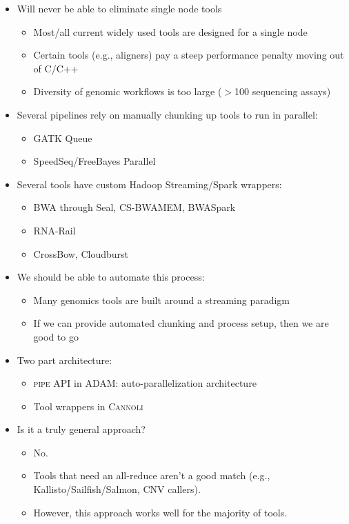 \documentclass[phd]{ucbthesis}
\begin{document}
\begin{itemize}
\item Will never be able to eliminate single node tools
  \begin{itemize}
  \item Most/all current widely used tools are designed for a single node
  \item Certain tools (e.g., aligners) pay a steep performance penalty moving out of C/C++
  \item Diversity of genomic workflows is too large ($>$100 sequencing assays)
  \end{itemize}
\item Several pipelines rely on manually chunking up tools to run in parallel:
  \begin{itemize}
  \item GATK Queue
  \item SpeedSeq/FreeBayes Parallel
  \end{itemize}
\item Several tools have custom Hadoop Streaming/Spark wrappers:
  \begin{itemize}
  \item BWA through Seal, CS-BWAMEM, BWASpark
  \item RNA-Rail
  \item CrossBow, Cloudburst
  \end{itemize}
\item We should be able to automate this process:
  \begin{itemize}
  \item Many genomics tools are built around a streaming paradigm
  \item If we can provide automated chunking and process setup, then we are good to go
  \end{itemize}
\item Two part architecture:
  \begin{itemize}
  \item \textsc{pipe} API in \textsc{ADAM}: auto-parallelization architecture
  \item Tool wrappers in \textsc{Cannoli}
  \end{itemize}
\item Is it a truly general approach?
  \begin{itemize}
  \item No.
  \item Tools that need an all-reduce aren't a good match (e.g., Kallisto/Sailfish/Salmon,
    CNV callers).
  \item However, this approach works well for the majority of tools.
  \end{itemize}
\end{itemize}
\end{document}
